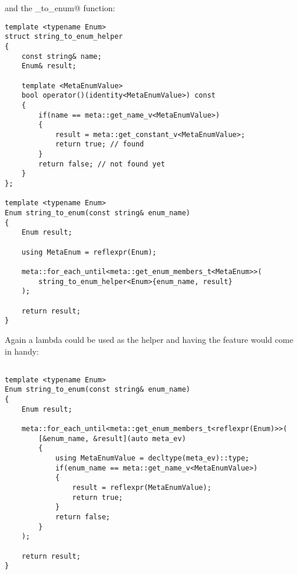 and the \verb@string_to_enum@ function:

\begin{verbatim}
template <typename Enum>
struct string_to_enum_helper
{
	const string& name;
	Enum& result;

	template <MetaEnumValue>
	bool operator()(identity<MetaEnumValue>) const
	{
		if(name == meta::get_name_v<MetaEnumValue>)
		{
			result = meta::get_constant_v<MetaEnumValue>;
			return true; // found
		}
		return false; // not found yet
	}
};

template <typename Enum>
Enum string_to_enum(const string& enum_name)
{
	Enum result;

	using MetaEnum = reflexpr(Enum);

	meta::for_each_until<meta::get_enum_members_t<MetaEnum>>(
		string_to_enum_helper<Enum>{enum_name, result}
	);

	return result;
}
\end{verbatim}

Again a lambda could be used as the helper and having the 
feature would come in handy:

\begin{verbatim}

template <typename Enum>
Enum string_to_enum(const string& enum_name)
{
	Enum result;

	meta::for_each_until<meta::get_enum_members_t<reflexpr(Enum)>>(
		[&enum_name, &result](auto meta_ev)
		{
			using MetaEnumValue = decltype(meta_ev)::type;
			if(enum_name == meta::get_name_v<MetaEnumValue>)
			{
				result = reflexpr(MetaEnumValue);
				return true;
			}
			return false;
		}
	);

	return result;
}
\end{verbatim}

